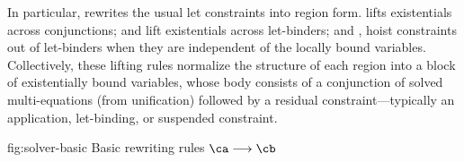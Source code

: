 \documentclass[acmsmall,screen,nonacm,review]{acmart}
\begin{document}

In particular,  rewrites the usual let constraints into region
form.
%
 lifts existentials across conjunctions;
 and  lift existentials across
let-binders; and ,  hoist
constraints out of let-binders when they are independent of the locally bound
variables.
%
Collectively, these lifting rules normalize the structure of each region into a
block of existentially bound variables, whose body consists of a conjunction of
solved multi-equations (from unification) followed by a residual
constraint---typically an application, let-binding, or suspended constraint.

\begin{mathparfig}[htpb!]
  {fig:solver-basic}
  {Basic rewriting rules $\ca \csolve \cb$}
  \rewrite[S-Unif]
    {\upa \\ \upa \unif \upb}
    {\upb}

  \rewrite[S-False]
    {\C\where\cfalse \\ \C \neq \square}
    {\cfalse}

  \rewrite[S-Let]
    {\clet \x \tv \ca \cb}
    {\cletr \x \tv \eset \ca \cb}

    {\cexists \tv {\ca \cand \cb}}

    {\cletr \x \tv {\tvs, \tvb} \ca \cb}

    {\cexists \tvb {\clet \x \tvs \ca \cb}}

    {\ca \cand \cletr \x \tv \tvs \cb \cc}

    {\cc \cand \Clet \x \tv \ca \cb}
\end{mathparfig}


\end{document}
